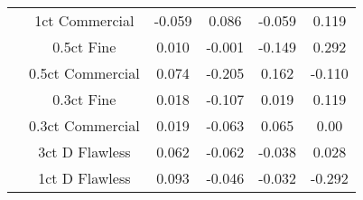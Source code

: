 \begin{tabularx}{1\textwidth}{Xccccc}
								& 1ct Commercial & -0.059 & 0.086 & -0.059 & 0.119 \\
								& 0.5ct Fine & 0.010 & -0.001 & -0.149 & 0.292 \\
								& 0.5ct Commercial & 0.074 & -0.205 & 0.162 & -0.110 \\
								& 0.3ct Fine & 0.018 & -0.107 & 0.019 & 0.119 \\
								& 0.3ct Commercial & 0.019 & -0.063 & 0.065 & 0.00 \\
								& 3ct D Flawless & 0.062 & -0.062 & -0.038 & 0.028 \\
								& 1ct D Flawless & 0.093 & -0.046 & -0.032 & -0.292 \\
\bottomrule
\end{tabularx}